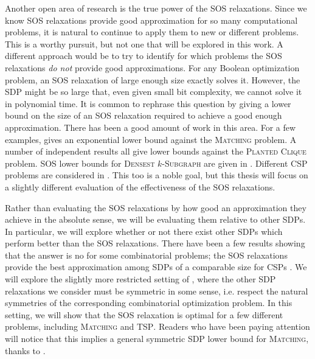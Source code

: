 Another open area of research is the true power of the SOS relaxations.
Since we know SOS relaxations provide good approximation for so many computational problems, it is natural to continue to apply them to new or different problems.
This is a worthy pursuit, but not one that will be explored in this work.
A different approach would be to try to identify for which problems the SOS relaxations \emph{do not} provide good approximations.
For any Boolean optimization problem, an SOS relaxation of large enough size exactly solves it.
However, the SDP might be so large that, even given small bit complexity, we cannot solve it in polynomial time.
It is common to rephrase this question by giving a lower bound on the size of an SOS relaxation required to achieve a good enough approximation.
There has been a good amount  of work in this area. For a few examples, \cite{Gri01} gives an exponential lower bound against the \textsc{Matching} problem. A number of independent results \cite{RS15,MPW15,BHKKMP16}  all give lower bounds against the \textsc{Planted Clique} problem. SOS lower bounds for \textsc{Densest $k$-Subgraph} are given in \cite{BCVGZ12}. Different \textsc{CSP} problems are considered in \cite{GMT09,Tul09,Sch08,LRS15}.
This too is a noble goal, but this thesis will focus on a slightly different evaluation of the effectiveness of the SOS relaxations.

Rather than evaluating the SOS relaxations by how good an approximation they achieve in the absolute sense, we will be evaluating them relative to other SDPs.
In particular, we will explore whether or not there exist other SDPs which perform better than the SOS relaxations.
There have been a few results showing that the answer is no for some combinatorial problems; the SOS relaxations provide the best approximation among SDPs of a comparable size for CSPs \cite{LRST14,LRS15}. We will explore the slightly more restricted setting of \cite{LRST14}, where the other SDP relaxations we consider must be symmetric in some sense, i.e. respect the natural symmetries of the corresponding combinatorial optimization problem. In this setting, we will show that the SOS relaxation is optimal for a few different problems, including \textsc{Matching} and \textsc{TSP}. Readers who have been paying attention  will notice that this implies a general symmetric SDP lower bound for \textsc{Matching}, thanks to \cite{Gri01}.


